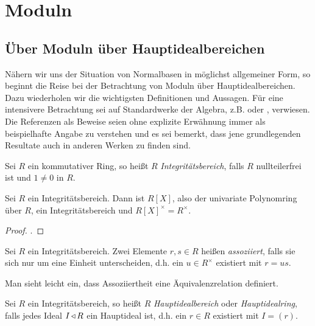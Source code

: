 \chapter{Moduln}
\label{chap:moduln}

\section{Über Moduln über Hauptidealbereichen}
\label{sec:Moduln}

Nähern wir uns der Situation von Normalbasen in möglichst allgemeiner Form, so
beginnt die Reise bei der Betrachtung von Moduln über Hauptidealbereichen. Dazu
wiederholen wir die wichtigsten Definitionen und Aussagen. Für eine intensivere
Betrachtung sei auf Standardwerke der Algebra, z.B. 
\autocite{lang2002algebra} oder \autocite{hartley1974rings}, verwiesen.
Die Referenzen als Beweise seien ohne explizite Erwähnung immer 
als beispielhafte Angabe zu verstehen und es
sei bemerkt, dass jene grundlegenden Resultate auch in anderen Werken zu 
finden sind.

\begin{definition}[Integritätsbereich]
  Sei $R$ ein kommutativer Ring, so heißt $R$ \emph{Integritätsbereich},
  falls $R$ nullteilerfrei ist und $1\neq 0$ in $R$.
\end{definition}

\begin{lemma}
  Sei $R$ ein Integritätsbereich. Dann ist $R[X]$, also der 
  univariate Polynomring über $R$, ein Integritätsbereich und
  $R[X]^\times = R^\times$.
\end{lemma}
\begin{proof}
  \autocite[Lemma 13.4]{karpfinger2010algebra}.
\end{proof}

\begin{definition}
  Sei $R$ ein Integritätsbereich. Zwei Elemente $r,s\in R$ heißen 
  \emph{assoziiert}, falls sie sich nur um eine Einheit unterscheiden, d.h. ein
  $u \in R^\times$ existiert mit $r = us$.
\end{definition}

\begin{bemerkung}
  Man sieht leicht ein, dass Assoziiertheit eine Äquivalenzrelation definiert.
\end{bemerkung}

\begin{definition}[Hauptidealbereich]
  Sei $R$ ein Integritätsbereich, so heißt $R$ \emph{Hauptidealbereich}
  oder \emph{Hauptidealring}, falls jedes Ideal $I\operatorname{\triangleleft} R$ ein
  Hauptideal ist, d.h. ein $r \in R$ existiert mit
  $I = (r)$.
\end{definition}


